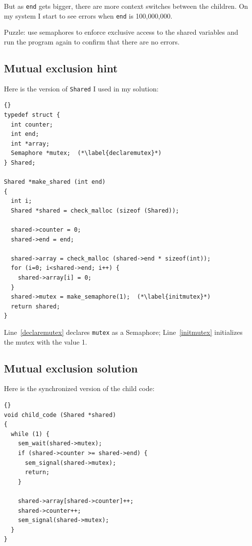 \documentclass{book}
\newcommand{\clearemptydoublepage}{\newpage\cleardoublepage}
\begin{document}
But as {\tt end} gets bigger, there are more context switches between
the children.  On my system I start to see errors when
{\tt end} is 100,000,000.

Puzzle: use semaphores to enforce exclusive access to the shared
variables and run the program again to confirm that there are
no errors.

\clearemptydoublepage
\subsection{Mutual exclusion hint}

Here is the version of {\tt Shared} I used in my solution:

\begin{latin}
\begin{lstlisting}[title={}]{}
typedef struct {
  int counter;
  int end;
  int *array;
  Semaphore *mutex;  (*\label{declaremutex}*)
} Shared;

Shared *make_shared (int end)
{
  int i;
  Shared *shared = check_malloc (sizeof (Shared));

  shared->counter = 0;
  shared->end = end;

  shared->array = check_malloc (shared->end * sizeof(int));
  for (i=0; i<shared->end; i++) {
    shared->array[i] = 0;
  }
  shared->mutex = make_semaphore(1);  (*\label{initmutex}*)
  return shared;
}
\end{lstlisting}
\end{latin}

Line~\ref{declaremutex} declares {\tt mutex} as a Semaphore;
Line~\ref{initmutex} initializes the mutex with the value 1.


\clearemptydoublepage
\subsection{Mutual exclusion solution}

Here is the synchronized version of the child code:

\begin{latin}
\begin{lstlisting}[title={}]{}
void child_code (Shared *shared)
{
  while (1) {
    sem_wait(shared->mutex);
    if (shared->counter >= shared->end) {
      sem_signal(shared->mutex);
      return;
    }

    shared->array[shared->counter]++;
    shared->counter++;
    sem_signal(shared->mutex);
  }
}
\end{lstlisting}
\end{latin}
\end{document}
